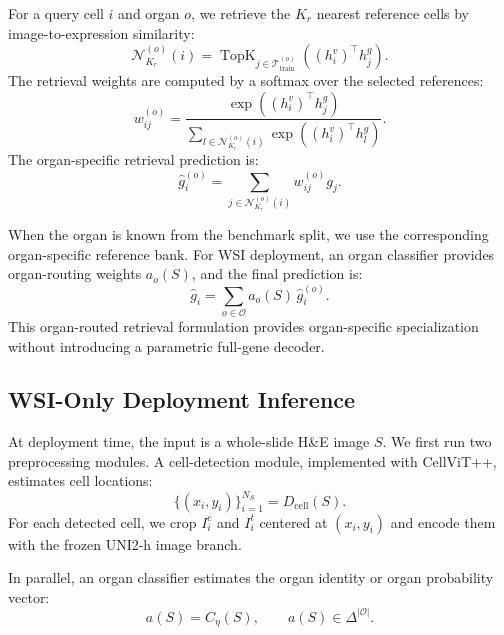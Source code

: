 \documentclass[sigconf]{acmart}
\begin{document}
For a query cell $i$ and organ $o$, we retrieve the $K_r$ nearest reference cells by image-to-expression similarity:
\begin{equation}
    \mathcal{N}^{(o)}_{K_r}(i)
    =
    \operatorname{TopK}_{j \in \mathcal{T}^{(o)}_{\mathrm{train}}}
    \left((h_i^v)^\top h_j^g\right).
\end{equation}
The retrieval weights are computed by a softmax over the selected references:
\begin{equation}
    w^{(o)}_{ij}
    =
    \frac{
    \exp((h_i^v)^\top h_j^g)
    }{
    \sum_{l \in \mathcal{N}^{(o)}_{K_r}(i)}
    \exp((h_i^v)^\top h_l^g)
    }.
\end{equation}
The organ-specific retrieval prediction is:
\begin{equation}
    \hat{g}^{(o)}_i
    =
    \sum_{j \in \mathcal{N}^{(o)}_{K_r}(i)}
    w^{(o)}_{ij} g_j.
\end{equation}

When the organ is known from the benchmark split, we use the corresponding organ-specific reference bank. For WSI deployment, an organ classifier provides organ-routing weights $a_o(S)$, and the final prediction is:
\begin{equation}
    \hat{g}_i
    =
    \sum_{o\in\mathcal{O}}
    a_o(S)\,\hat{g}^{(o)}_i.
\end{equation}
This organ-routed retrieval formulation provides organ-specific specialization without introducing a parametric full-gene decoder.




\subsection{WSI-Only Deployment Inference}
\label{sec:wsi_inference}

At deployment time, the input is a whole-slide H\&E image $S$. We first run two preprocessing modules. A cell-detection module, implemented with CellViT++, estimates cell locations:
\begin{equation}
    \{(x_i,y_i)\}_{i=1}^{N_S}
    =
    D_{\mathrm{cell}}(S).
\end{equation}
For each detected cell, we crop $I_i^c$ and $I_i^t$ centered at $(x_i,y_i)$ and encode them with the frozen UNI2-h image branch.

In parallel, an organ classifier estimates the organ identity or organ probability vector:
\begin{equation}
    a(S) = C_{\eta}(S), \qquad a(S)\in\Delta^{|\mathcal{O}|}.
\end{equation}
\end{document}
